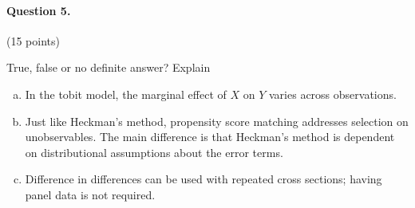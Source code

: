 \documentclass[a4paper, 12pt]{article}
\begin{document}
\paragraph{Question 5.} (15 points)

True, false or no definite answer? Explain

\begin{enumerate}[(a)]
	\item In the tobit model, the marginal effect of $X$ on $Y$ varies across observations. 
	\item Just like Heckman's method, propensity score matching addresses selection on unobservables. The main difference is that Heckman's method is dependent on distributional assumptions about the error terms.
	\item Difference in differences can be used with repeated cross sections; having panel data is not required.
\end{enumerate}
\end{document}
